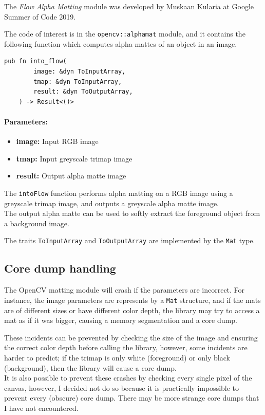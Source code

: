 \documentclass[a4paper]{article}
\begin{document}
The \textit{Flow Alpha Matting} module was developed by Muskaan Kularia
at Google Summer of Code 2019.

The code of interest is in the \texttt{opencv::alphamat} module,
and it contains the following function which computes alpha mattes of an object in an image.

\begin{lstlisting}[style=Rust, style=boxed]
    pub fn into_flow(
        image: &dyn ToInputArray,
        tmap: &dyn ToInputArray,
        result: &dyn ToOutputArray,
    ) -> Result<()>
\end{lstlisting}

\paragraph{Parameters:}
\begin{itemize}
    \item \textbf{image:} Input RGB image
    \item \textbf{tmap:} Input greyscale trimap image
    \item \textbf{result:} Output alpha matte image
\end{itemize}

The \texttt{intoFlow} function performs alpha \gls{matting} on a RGB image
using a greyscale \gls{trimap} image, and outputs a greyscale alpha matte image. \\
The output alpha matte can be used to softly extract the foreground
object from a background image. %

The \gls{trait}s \texttt{ToInputArray} and \texttt{ToOutputArray}
are implemented by the \texttt{Mat} type.

\pagebreak

\subsection{Core dump handling}

The OpenCV \gls{matting} module will crash if the parameters
are incorrect. For instance, the image parameters are represents by a
\texttt{Mat} structure, and if the mats are of different sizes or have different color depth,
the library may try to access a mat as if it was bigger, causing a memory segmentation
and a core dump.

These incidents can be prevented by checking the size of the image and ensuring the correct
color depth before calling the library, however, some incidents are harder
to predict; if the \gls{trimap} is only white (foreground) or only black (background),
then the library will cause a core dump. \\
It is also possible to prevent these crashes by checking every single pixel
of the canvas, however, I decided not do so because it is practically impossible
to prevent every (obscure) core dump. There may be more strange core dumps
that I have not encountered.
\end{document}
